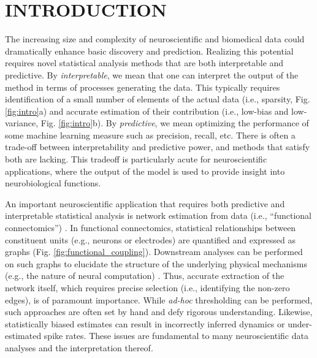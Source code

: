 \documentclass[letterpaper, 10 pt, conference]{ieeeconf}  %
\begin{document}
\section{INTRODUCTION}
The increasing size and complexity of neuroscientific and biomedical data could dramatically enhance basic discovery and prediction. Realizing this potential requires novel statistical analysis methods that are both interpretable and predictive. By \textit{interpretable}, we mean that one can interpret the output of the method in terms of processes generating the data. This typically requires identification of a small number of elements of the actual data (i.e., sparsity, Fig. \ref{fig:intro}a) and accurate estimation of their contribution (i.e., low-bias and low-variance, Fig. \ref{fig:intro}b). By \textit{predictive}, we mean optimizing the performance of some machine learning measure such as precision, recall, etc. There is often a trade-off between interpretability and predictive power, and methods that satisfy both are lacking. This tradeoff is particularly acute for neuroscientific applications, where the output of the model is used to provide insight into neurobiological functions. 

An important neuroscientific application that requires both predictive and interpretable statistical analysis is network estimation from data (i.e., ``functional connectomics'') \cite{fc}. In functional connectomics, statistical relationships between constituent units (e.g., neurons or electrodes) are quantified and expressed as graphs (Fig. \ref{fig:functional_coupling}). Downstream analyses can be performed on such graphs to elucidate the structure of the underlying physical mechanisms (e.g., the nature of neural computation) \cite{bassett}. Thus, accurate extraction of the network itself, which requires precise selection (i.e., identifying the non-zero edges), is of paramount importance. While \textit{ad-hoc} thresholding can be performed, such approaches are often set by hand and defy rigorous understanding. Likewise, statistically biased estimates can result in incorrectly inferred dynamics or under-estimated spike rates. These issues are fundamental to many neuroscientific data analyses and the interpretation thereof.
\end{document}
